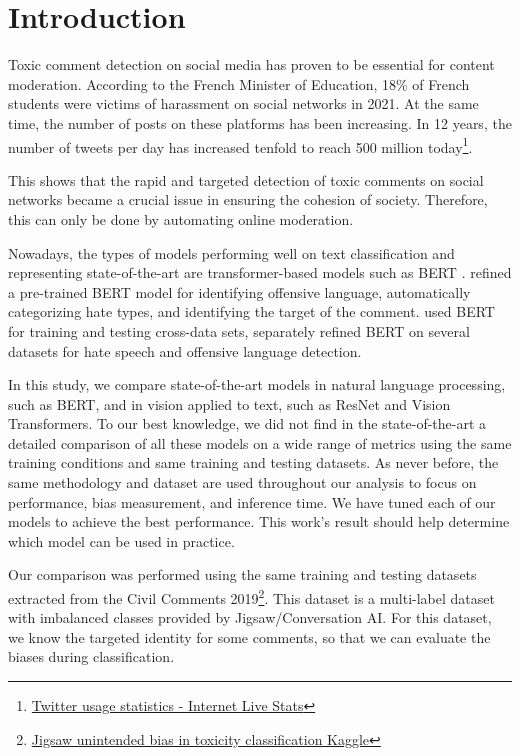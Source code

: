 \documentclass[a4paper,english]{rnti}
\affiliation{
    \texttt{firstname.lastname@epita.fr}\\
    EPITA Speaker and Language Recognition Group (ESLR),\\    
    Laboratoire de Recherche de l'EPITA (LRE), France}
\begin{document}
\section{Introduction}

Toxic comment detection on social media has proven to be essential for content moderation. According to the French Minister of Education, 18\% of French students were victims of harassment on social networks in 2021. At the same time, the number of posts on these platforms has been increasing. In 12 years, the number of tweets per day has increased tenfold to reach 500 million today\footnote{\href{https://www.internetlivestats.com/twitter-statistics/}{Twitter usage statistics - Internet Live Stats}}.

This shows that the rapid and targeted detection of toxic comments on social networks became a crucial issue in ensuring the cohesion of society. Therefore, this can only be done by automating online moderation.

Nowadays, the types of models performing well on text classification and representing state-of-the-art are transformer-based models \citep{32} such as BERT \citep{33}. \citet{34} refined a pre-trained BERT model for identifying offensive language, automatically categorizing hate types, and identifying the target of the comment. \citet{35} used BERT for training and testing cross-data sets, \citet{36} separately refined BERT on several datasets for hate speech and offensive language detection.

In this study, we compare state-of-the-art models in natural language processing, such as BERT, and in vision applied to text, such as ResNet and Vision Transformers. To our best knowledge, we did not find in the state-of-the-art a detailed comparison of all these models on a wide range of metrics using the same training conditions and same training and testing datasets. As never before,  the same methodology and dataset are used throughout our analysis to focus on performance, bias measurement, and inference time. We have tuned each of our models to achieve the best performance. This work's result should help determine which model can be used in practice.

Our comparison was performed using the same training and testing datasets extracted from the Civil Comments 2019\footnote{\href{https://www.kaggle.com/c/jigsaw-unintended-bias-in-toxicity-classification/data}{Jigsaw unintended bias in toxicity classification Kaggle}\label{civil-comments-data}}. This dataset is a multi-label dataset with imbalanced classes provided by Jigsaw/Conversation AI. For this dataset, we know the targeted identity for some comments, so that we can evaluate the biases during classification.
\end{document}
